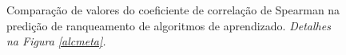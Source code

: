 \begin{figure}
\caption[Comparação da correlação na predição de ranqueamento de algoritmos.]{Comparação de valores do coeficiente de correlação de Spearman na predição de ranqueamento de algoritmos de aprendizado.
\textit{Detalhes na Figura \ref{alcmeta}.}}
\label{corrmeta}

\end{figure}
